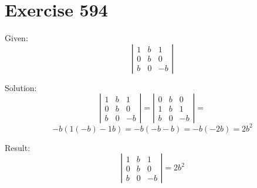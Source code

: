 \documentclass[a4paper, 10pt]{scrartcl}
\begin{document}
\section{Exercise 594}

Given:
\[
\left|
    \begin{array}{ccc}
    1 & b & 1\\
    0 & b & 0\\
    b & 0 & -b
    \end{array}
\right|
\]

Solution:
\[
\left|
    \begin{array}{ccc}
    1 & b & 1\\
    0 & b & 0\\
    b & 0 & -b
    \end{array}
\right| =
\left|
    \begin{array}{ccc}
    0 & b & 0\\
    1 & b & 1\\
    b & 0 & -b
    \end{array}
\right| =
\]
\[
 -b(1(-b) - 1b) = -b(-b - b) = -b(-2b) = 2b^{2}
\]

Result:
\[
\left|
    \begin{array}{ccc}
    1 & b & 1\\
    0 & b & 0\\
    b & 0 & -b
    \end{array}
\right| = 2b^{2}
\]
\end{document}
